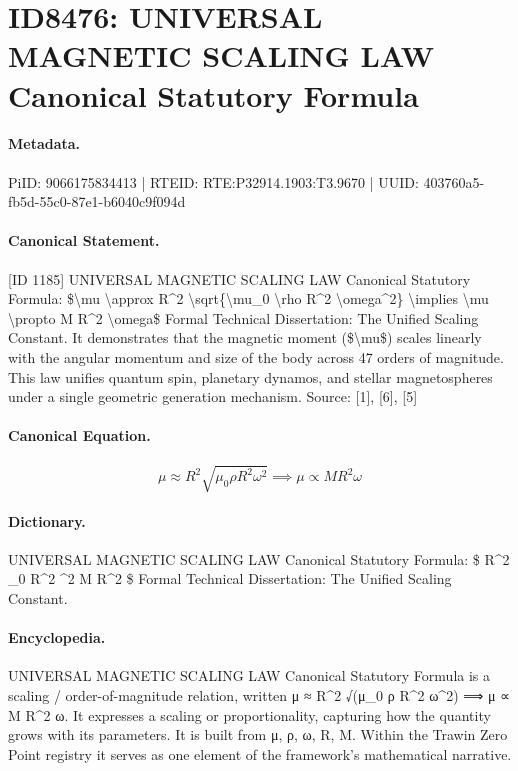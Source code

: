 \section*{ID8476: UNIVERSAL MAGNETIC SCALING LAW Canonical Statutory Formula}
\paragraph{Metadata.}
PiID: 9066175834413 | RTEID: RTE:P32914.1903:T3.9670 | UUID: 403760a5-fb5d-55c0-87e1-b6040c9f094d

\paragraph{Canonical Statement.}
[ID 1185] UNIVERSAL MAGNETIC SCALING LAW Canonical Statutory Formula: \$\textbackslash{}mu \textbackslash{}approx R\textasciicircum{}2 \textbackslash{}sqrt\{\textbackslash{}mu\_0 \textbackslash{}rho R\textasciicircum{}2 \textbackslash{}omega\textasciicircum{}2\} \textbackslash{}implies \textbackslash{}mu \textbackslash{}propto M R\textasciicircum{}2 \textbackslash{}omega\$ Formal Technical Dissertation: The Unified Scaling Constant. It demonstrates that the magnetic moment (\$\textbackslash{}mu\$) scales linearly with the angular momentum and size of the body across 47 orders of magnitude. This law unifies quantum spin, planetary dynamos, and stellar magnetospheres under a single geometric generation mechanism. Source: [1], [6], [5]

\paragraph{Canonical Equation.}
\[
\mu \approx R^2 \sqrt{\mu_0 \rho R^2 \omega^2} \implies \mu \propto M R^2 \omega
\]

\paragraph{Dictionary.}
UNIVERSAL MAGNETIC SCALING LAW Canonical Statutory Formula: \$ R\textasciicircum{}2 \_0 R\textasciicircum{}2 \textasciicircum{}2 M R\textasciicircum{}2 \$ Formal Technical Dissertation: The Unified Scaling Constant.

\paragraph{Encyclopedia.}
UNIVERSAL MAGNETIC SCALING LAW Canonical Statutory Formula is a scaling / order-of-magnitude relation, written μ ≈ R\textasciicircum{}2 √(μ\_0 ρ R\textasciicircum{}2 ω\textasciicircum{}2) ⟹ μ ∝ M R\textasciicircum{}2 ω. It expresses a scaling or proportionality, capturing how the quantity grows with its parameters. It is built from μ, ρ, ω, R, M. Within the Trawin Zero Point registry it serves as one element of the framework's mathematical narrative.
